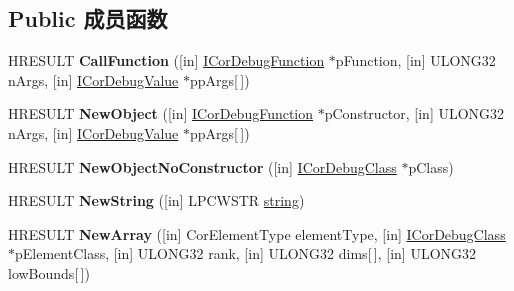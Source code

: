 \subsection*{Public 成员函数}
\begin{DoxyCompactItemize}
\item 
\mbox{\label{interface_i_cor_debug_eval_a75643afa471e077594c5002df8c8cd09}} 
H\+R\+E\+S\+U\+LT {\bfseries Call\+Function} (\mbox{[}in\mbox{]} \hyperlink{interface_i_cor_debug_function}{I\+Cor\+Debug\+Function} $\ast$p\+Function, \mbox{[}in\mbox{]} U\+L\+O\+N\+G32 n\+Args, \mbox{[}in\mbox{]} \hyperlink{interface_i_cor_debug_value}{I\+Cor\+Debug\+Value} $\ast$pp\+Args\mbox{[}$\,$\mbox{]})
\item 
\mbox{\label{interface_i_cor_debug_eval_a10b9fe17a013038b0d716c1711d5423f}} 
H\+R\+E\+S\+U\+LT {\bfseries New\+Object} (\mbox{[}in\mbox{]} \hyperlink{interface_i_cor_debug_function}{I\+Cor\+Debug\+Function} $\ast$p\+Constructor, \mbox{[}in\mbox{]} U\+L\+O\+N\+G32 n\+Args, \mbox{[}in\mbox{]} \hyperlink{interface_i_cor_debug_value}{I\+Cor\+Debug\+Value} $\ast$pp\+Args\mbox{[}$\,$\mbox{]})
\item 
\mbox{\label{interface_i_cor_debug_eval_a1990f230178933cd6da36137223add7d}} 
H\+R\+E\+S\+U\+LT {\bfseries New\+Object\+No\+Constructor} (\mbox{[}in\mbox{]} \hyperlink{interface_i_cor_debug_class}{I\+Cor\+Debug\+Class} $\ast$p\+Class)
\item 
\mbox{\label{interface_i_cor_debug_eval_ae76ec563ed2cea73cf9c09eb79300509}} 
H\+R\+E\+S\+U\+LT {\bfseries New\+String} (\mbox{[}in\mbox{]} L\+P\+C\+W\+S\+TR \hyperlink{structstring}{string})
\item 
\mbox{\label{interface_i_cor_debug_eval_a5809ffbf042df458e434578d4b5d3a73}} 
H\+R\+E\+S\+U\+LT {\bfseries New\+Array} (\mbox{[}in\mbox{]} Cor\+Element\+Type element\+Type, \mbox{[}in\mbox{]} \hyperlink{interface_i_cor_debug_class}{I\+Cor\+Debug\+Class} $\ast$p\+Element\+Class, \mbox{[}in\mbox{]} U\+L\+O\+N\+G32 rank, \mbox{[}in\mbox{]} U\+L\+O\+N\+G32 dims\mbox{[}$\,$\mbox{]}, \mbox{[}in\mbox{]} U\+L\+O\+N\+G32 low\+Bounds\mbox{[}$\,$\mbox{]})
\item 
\mbox{\label{interface_i_cor_debug_eval_a342e704e648ac7719c279ab8edc089cd}} 

\end{DoxyCompactItemize}
